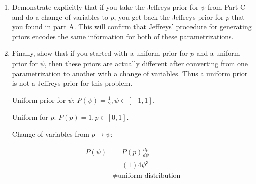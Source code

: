 \begin{enumerate}[label=\textbf{\Alph*}.]

    \item Demonstrate explicitly that if you take the Jeffreys prior for $\psi$ from Part C and do a change of variables to $p$, you get back the Jeffreys prior for $p$ that you found in part A. This will confirm that Jeffreys' procedure for generating priors encodes the same information for both of these parametrizations.
    
    \item Finally, show that if you started with a uniform prior for $p$ and a uniform prior for $\psi$, then these priors are actually different after converting from one parametrization to another with a change of variables. Thus a uniform prior is not a Jeffreys prior for this problem.
    
    Uniform prior for $\psi$: $P(\psi) = \frac{1}{2}, \psi \in [-1,1]$.

    Uniform for $p$: $P(p) = 1, p \in [0,1]$.

    Change of variables from $p \to \psi$:

    \begin{align*}
        P(\psi) &= P(p) \frac{dp}{d\psi} \\
        &= (1) 4\psi^3 \\
        &\neq \text{uniform distribution} \\
    \end{align*}

\end{enumerate}

